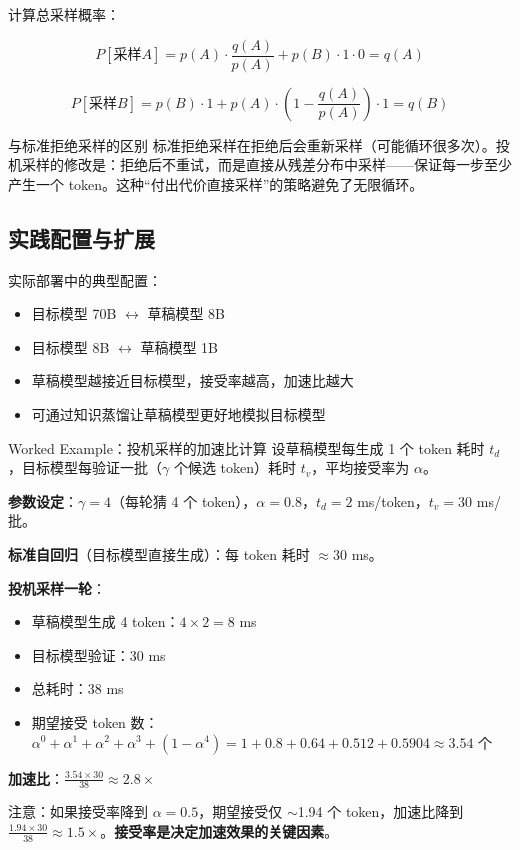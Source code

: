 计算总采样概率：

$$P[\text{采样} A] = p(A) \cdot \frac{q(A)}{p(A)} + p(B) \cdot 1 \cdot 0 = q(A)$$

$$P[\text{采样} B] = p(B) \cdot 1 + p(A) \cdot \left(1 - \frac{q(A)}{p(A)}\right) \cdot 1 = q(B)$$

\begin{knowledgebox}{与标准拒绝采样的区别}
标准拒绝采样在拒绝后会重新采样（可能循环很多次）。投机采样的修改是：拒绝后不重试，而是直接从残差分布中采样——保证每一步至少产生一个 token。这种``付出代价直接采样''的策略避免了无限循环。
\end{knowledgebox}

\subsection{实践配置与扩展}

实际部署中的典型配置：

\begin{itemize}
    \item 目标模型 70B $\leftrightarrow$ 草稿模型 8B
    \item 目标模型 8B $\leftrightarrow$ 草稿模型 1B
    \item 草稿模型越接近目标模型，接受率越高，加速比越大
    \item 可通过知识蒸馏让草稿模型更好地模拟目标模型
\end{itemize}

\begin{knowledgebox}{Worked Example：投机采样的加速比计算}
设草稿模型每生成 1 个 token 耗时 $t_d$，目标模型每验证一批（$\gamma$ 个候选 token）耗时 $t_v$，平均接受率为 $\alpha$。

\textbf{参数设定}：$\gamma = 4$（每轮猜 4 个 token），$\alpha = 0.8$，$t_d = 2$ ms/token，$t_v = 30$ ms/批。

\textbf{标准自回归}（目标模型直接生成）：每 token 耗时 $\approx 30$ ms。

\textbf{投机采样一轮}：
\begin{itemize}
    \item 草稿模型生成 4 token：$4 \times 2 = 8$ ms
    \item 目标模型验证：$30$ ms
    \item 总耗时：$38$ ms
    \item 期望接受 token 数：$\alpha^0 + \alpha^1 + \alpha^2 + \alpha^3 + (1 - \alpha^4) = 1 + 0.8 + 0.64 + 0.512 + 0.5904 \approx 3.54$ 个
\end{itemize}

\textbf{加速比}：$\frac{3.54 \times 30}{38} \approx 2.8\times$

注意：如果接受率降到 $\alpha = 0.5$，期望接受仅 $\sim$1.94 个 token，加速比降到 $\frac{1.94 \times 30}{38} \approx 1.5\times$。\textbf{接受率是决定加速效果的关键因素}。
\end{knowledgebox}

